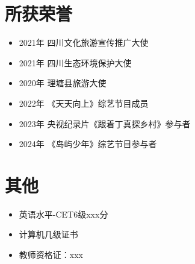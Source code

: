 \section{\makebox[\widthof{\faStar}][c]{\color{SCU_Red}{\faStar}}\quad 所获荣誉}
\vspace{-1em}
\begin{multicols}{2}
    \begin{itemize}
        \item 2021年 四川文化旅游宣传推广大使
        \item 2021年 四川生态环境保护大使
        \item 2020年 理塘县旅游大使
        \item 2022年 《天天向上》综艺节目成员
        \item 2023年 央视纪录片《跟着丁真探乡村》参与者
        \item 2024年 《岛屿少年》综艺节目参与者
    \end{itemize}
\end{multicols}


\section{\makebox[\widthof{\faInfo}][c]{\color{SCU_Red}{\faInfo}}\quad 其他}
\begin{itemize}
    \item 英语水平-CET6级xxx分
    \item 计算机几级证书
    \item 教师资格证：xxx
\end{itemize}



